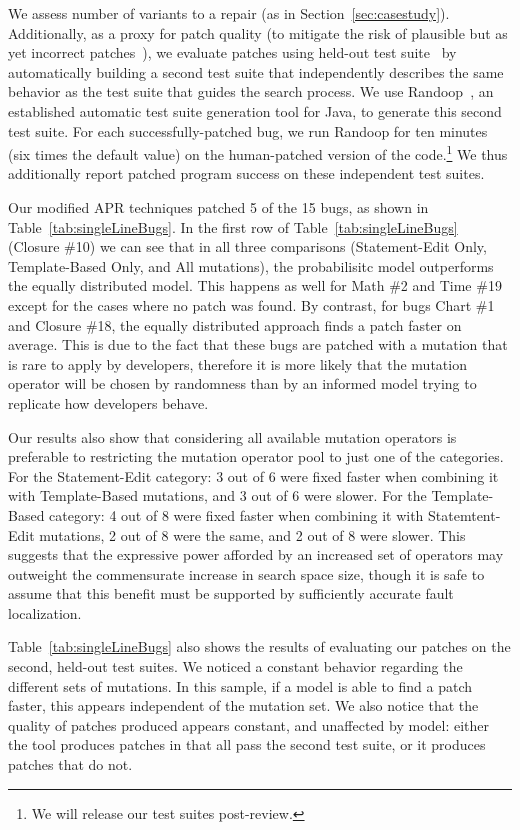 \documentclass[conference]{IEEEtran}
\begin{document}
We assess number of variants to a repair (as in
Section~\ref{sec:casestudy}).  Additionally, as a proxy for patch quality (to
mitigate the risk of plausible but as yet incorrect patches~\cite{Qi15}), we
evaluate patches using held-out test suite~\cite{legoues2012,Smith15} by automatically building a second
test suite that independently describes the same behavior as the test suite that
guides the search process. We use Randoop~\cite{pacheco07}, an established
automatic test suite generation tool for Java, to generate this second test
suite. 
For each successfully-patched bug, we 
run Randoop for ten minutes (six times the default value) on the human-patched
version of the code.\footnote{We will release our test suites post-review.}  We
thus additionally report patched program success on these independent test
suites. 

Our modified APR techniques patched 5 of the 15 bugs, as shown in 
Table~\ref{tab:singleLineBugs}. In the first row of Table~\ref{tab:singleLineBugs} (Closure \#10) we can see
that in all three comparisons (Statement-Edit Only, Template-Based Only, and All
mutations), the probabilisitc model outperforms
the equally distributed model. This happens as well for
Math \#2 and Time \#19 except for the cases where no patch was
found. By contrast, for bugs Chart \#1 and Closure \#18, the equally
distributed approach finds a patch faster on average. This is due to the fact
that these bugs are patched with a mutation that is rare to apply by developers,
therefore it is more likely that the mutation operator will be chosen by randomness
than by an informed model trying to replicate how developers behave.

Our results also show that considering all available mutation operators is
preferable to 
restricting the mutation operator pool to just one of the categories. For the
Statement-Edit category: 3 out of 6 were fixed faster when combining it with
Template-Based mutations, and 3 out of 6 were slower. For the Template-Based
category: 4 out of 8 were fixed faster when combining it with Statemtent-Edit
mutations, 2 out of 8 were the same, and 2 out of 8 were slower. This suggests
that the expressive power afforded by an increased set of operators may
outweight the commensurate increase in search space size, though it is safe to
assume that this benefit must be supported by sufficiently accurate fault
localization. 

Table~\ref{tab:singleLineBugs} also shows the results of evaluating our patches
on the second, held-out test suites. We noticed a
constant behavior regarding the different sets of mutations. In this sample, if
a model is able to find a patch faster, this appears independent of the mutation
set.  We also notice that
the quality of patches produced  appears constant, and unaffected by model:
either the tool produces patches in 
that all pass the second test suite, or it produces patches that do not. 
\end{document}
